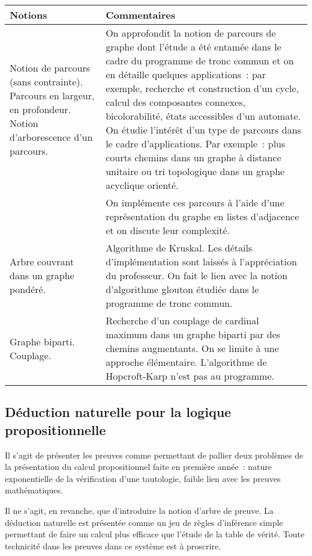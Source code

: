 \begin{longtable}{|p{\lnotion}|p{\comment}|}
    \hline
    \textbf{Notions} & \textbf{Commentaires} \\
    \hline \hline
    Notion de parcours (sans contrainte). Parcours en largeur, en profondeur. Notion d'arborescence d'un parcours. 
    &
    On approfondit la notion de parcours de graphe dont l'étude a été entamée dans le cadre du programme de tronc commun et on en détaille quelques applications~: par exemple, recherche et construction d'un cycle, calcul des composantes connexes, bicolorabilité, états accessibles d'un automate.
    On étudie l'intérêt d'un type de parcours dans le cadre d'applications. Par exemple~: plus courts chemins dans un graphe à distance unitaire ou tri topologique dans un graphe acyclique orienté. \\
    &
    On implémente ces parcours à l'aide d'une représentation du graphe en listes d'adjacence et on discute leur complexité.
     \\
    \hline
   Arbre couvrant dans un graphe pondéré.&Algorithme de Kruskal. Les détails d'implémentation sont laissés à l'appréciation du professeur. On fait le lien avec la notion d'algorithme glouton étudiée dans le programme de tronc commun. \\ \hline
   Graphe biparti. Couplage.& Recherche d'un couplage de cardinal maximum dans un graphe biparti par des chemins augmentants. On se limite à une approche élémentaire. L'algorithme de Hopcroft-Karp n'est pas au programme.\\
   
       \hline
\end{longtable}


\subsection{Déduction naturelle pour la logique propositionnelle}

Il s'agit de présenter les preuves comme permettant de pallier 
deux problèmes de la présentation du calcul propositionnel faite en première année~: nature
exponentielle de la vérification d'une tautologie, faible lien avec les preuves
mathématiques.

Il ne s'agit, en revanche, que d'introduire la notion d'arbre de preuve. La
déduction naturelle est présentée comme un jeu de règles d'inférence simple
permettant de faire un calcul plus efficace que l'étude de la table de vérité. Toute technicité dans
les preuves dans ce système est à proscrire.


